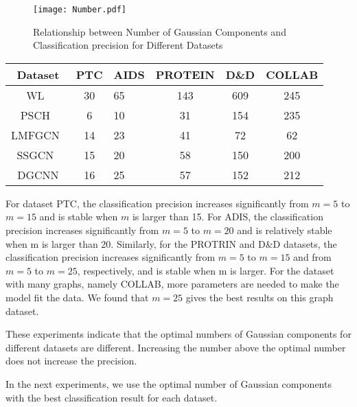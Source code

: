 \documentclass[11pt]{article}
\begin{document}
\begin{figure}
\vspace{-0.1in}
\centering
\texttt{[image: Number.pdf]}
\vspace{-0.1in}
\caption{Relationship between Number of Gaussian Components and Classification precision for Different Datasets}\label{fig:number}
\end{figure}

\begin {table*}
\small
 \caption{\label{tab:test_time}Comparison of running time on five graph datasets (in seconds)} \centering
 \vspace{0.2in}
 \begin{tabular}{cclccc}

  \toprule
  Dataset & PTC & AIDS & PROTEIN & D\&D & COLLAB \\
  \midrule
 WL~\cite{WeisfeilerReduction_26} & 30  & 65 & 143 & 609 & 245 \\
 PSCH~\cite{Niepert2016Learning_10} & 6 & 10 & 31 &154 & 235\\
 LMFGCN~\cite{Duvenaud2015Convolutional} & 14 & 23 & 41 & 72 & 62\\
 SSGCN~\cite{Kipf2016Semi_14} & 15 & 20 & 58 & 150 & 200 \\\hline
 DGCNN & 16 & 25 & 57 & 152 & 212 \\
  \bottomrule
 \end{tabular}
\end{table*}
For dataset PTC, the classification precision increases significantly from $m = 5$ to $m = 15$ and is stable when $m$ is larger than 15. For ADIS, the classification precision increases significantly from $m = 5$ to $m = 20$ and is relatively stable when m is larger than 20. Similarly, for the PROTRIN and D\&D datasets, the classification precision increases significantly from $m = 5$ to $m = 15$ and from $m = 5$ to $m = 25$, respectively, and is stable when m is larger. For the dataset with many graphs, namely COLLAB, more parameters are needed to make the model fit the data. We found that $m = 25$ gives the best results on this graph dataset.

These experiments indicate that the optimal numbers of Gaussian components for different datasets are different. Increasing the number above the optimal number does not increase the precision.

In the next experiments, we use the optimal number of Gaussian components with the best classification result for each dataset.
\end{document}
